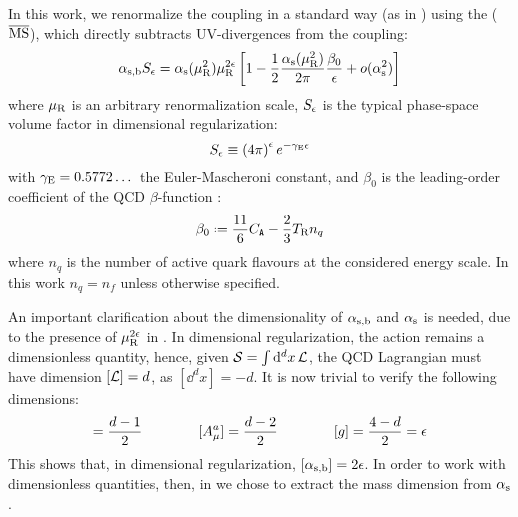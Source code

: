 In this work, we renormalize the coupling in a standard way (as in \cite{Catani-1998}) using the  ($ \overline{\text{MS}} $), which directly subtracts UV-divergences from the coupling:
\begin{equation}
  \alpha_\text{s,b} S_\epsilon = \alpha_\text{s}(\mu_\text{R}^2) \mu_\text{R}^{2\epsilon} \left[ 1 - \frac{1}{2} \frac{\alpha_\text{s}(\mu_\text{R}^2)}{2\pi} \frac{\beta_0}{\epsilon} + o(\alpha_\text{s}^2) \right]
  \label{eq:msb-def}
\end{equation}
where $ \mu_\text{R} $ is an arbitrary renormalization scale, $ S_\epsilon $ is the typical phase-space volume factor in dimensional regularization:
\begin{equation}
  S_\epsilon \equiv \left( 4\pi \right)^\epsilon e^{-\gamma_\text{E} \epsilon}
\end{equation}
with $ \gamma_\text{E} = 0.5772\dots $ the Euler-Mascheroni constant, and $ \beta_0 $ is the leading-order coefficient of the QCD $ \beta $-function :
\begin{equation}
  \beta_0 \defeq \frac{11}{6} \caa - \frac{2}{3} \ttr n_q
\end{equation}
where $ n_q $ is the number of active quark flavours at the considered energy scale. In this work $ n_q = n_f $ unless otherwise specified.

An important clarification about the dimensionality of $ \alpha_\text{s,b} $ and $ \alpha_\text{s} $ is needed, due to the presence of $ \mu_\text{R}^{2\epsilon} $ in . In dimensional regularization, the action remains a dimensionless quantity\footnotemark, hence, given $ \mathcal{S} = \int \mathrm{d}^dx \, \mathcal{L} $, the QCD Lagrangian  must have dimension $ [\mathcal{L}] = d $, as $ [\dd^dx] = -d $. It is now trivial to verify the following dimensions:
\begin{equation*}
  [\Psi] = \frac{d - 1}{2}
  \qquad \qquad
  [A_\mu^a] = \frac{d - 2}{2}
  \qquad \qquad
  [g] = \frac{4 - d}{2} = \de
\end{equation*}
This shows that, in dimensional regularization, $ [\alpha_\text{s,b}] = 2\epsilon $. In order to work with dimensionless quantities, then, in  we chose to extract the mass dimension from $ \alpha_\text{s} $.


